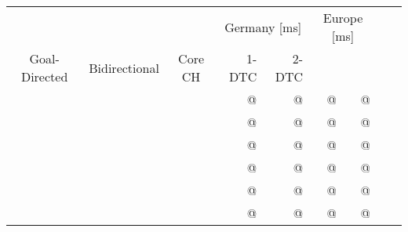 \begin{tabular}{cccrrrrrr}
	\toprule
	              &               &         & \multicolumn{2}{c}{Germany [\si{\milli\second}]} & \multicolumn{2}{c}{Europe [\si{\milli\second}]}         \\
	Goal-Directed & Bidirectional & Core CH & 1-DTC                                            & 2-DTC                                                   \\
	\midrule
	\xmark        & \xmark        & \xmark  & @                                                & @                                               & @ & @ \\
	\cmark        & \xmark        & \xmark  & @                                                & @                                               & @ & @ \\
	\xmark        & \cmark        & \xmark  & @                                                & @                                               & @ & @ \\
	\cmark        & \cmark        & \xmark  & @                                                & @                                               & @ & @ \\
	\xmark        & \cmark        & \cmark  & @                                                & @                                               & @ & @ \\
	\cmark        & \cmark        & \cmark  & @                                                & @                                               & @ & @ \\
	\bottomrule
\end{tabular}